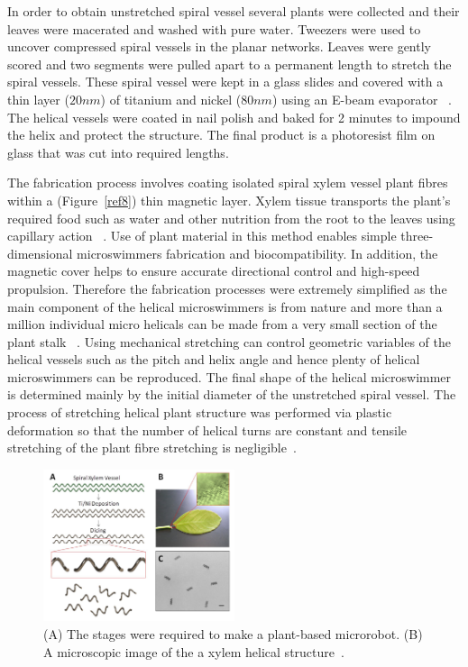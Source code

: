 \documentclass[12pt,a4paper,titlepage]{report}
\begin{document}
In order to obtain unstretched spiral vessel several plants were collected and their leaves were 
macerated and washed with pure water. Tweezers were used to uncover compressed spiral vessels 
in the planar networks. Leaves were gently scored and two segments were pulled apart to a permanent
 length to stretch the spiral vessels. These spiral vessel were kept in a glass slides and covered with a 
thin layer ($20 nm$) of titanium and nickel ($80 nm$) using an 
E-beam evaporator ~\citep{mahoney2011velocity}. The helical vessels were coated in nail 
polish and baked for 2 minutes to impound the helix and protect the structure. The final product is 
a photoresist film on glass that was cut into required lengths.      
  

The fabrication process involves coating isolated spiral xylem vessel plant fibres within a (Figure~\ref{ref8})
thin magnetic layer. Xylem tissue transports the plant\rq{}s required food such as water and other 
nutrition from the root to the leaves using capillary action ~\citep{mahoney2011velocity}.
Use of plant material in this method enables simple three-dimensional microswimmers fabrication 
and biocompatibility. In addition, the magnetic cover helps to ensure accurate directional control and 
high-speed propulsion. Therefore the fabrication processes were extremely simplified as the main 
component of the helical microswimmers is from nature and more than a million individual micro helicals 
can be made from a very small section of the plant stalk ~\citep{mahoney2011velocity}. Using mechanical stretching can control geometric variables of the helical vessels such as the pitch and
 helix angle and hence plenty of helical microswimmers can be reproduced. The final shape of the 
helical microswimmer is determined mainly by the initial diameter of the unstretched spiral vessel. The
 process of stretching helical plant structure was performed via plastic deformation so that the number 
of helical turns are constant and tensile stretching of the plant fibre stretching is negligible~\citep{mahoney2011velocity}. 


\begin{figure}
  \begin{center}
    \includegraphics[width=0.5\textwidth]{plants2}
  \caption[plant-based microrobot]{(A) The stages were required to make a plant-based microrobot. (B) A microscopic image of the 
a xylem helical structure~\citep{gao2013bioinspired}.}
  \label{plants2}
\end{center}
\end{figure}
\end{document}
